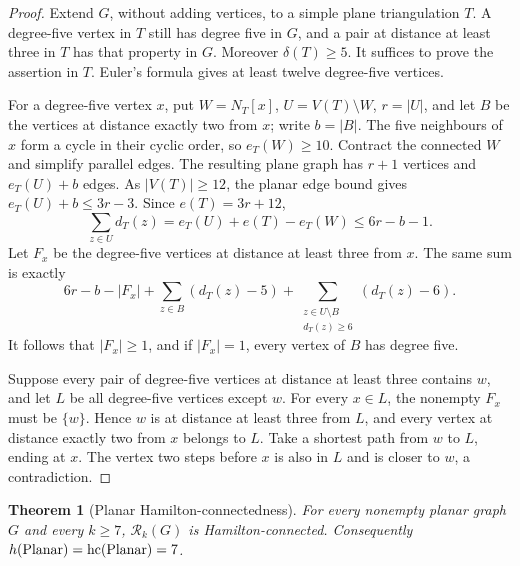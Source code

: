 \documentclass[11pt]{article}
\newtheorem{theorem}{Theorem}[section]
\theoremstyle{remark}
\newcommand{\Rk}{\mathcal R_k}
\newcommand{\hc}{\operatorname{hc}}
\numberwithin{equation}{section}
\numberwithin{table}{section}
\begin{document}
\begin{proof}
Extend $G$, without adding vertices, to a simple plane triangulation
$T$.  A degree-five vertex in $T$ still has degree five in $G$, and a
pair at distance at least three in $T$ has that property in $G$.
Moreover $\delta(T)\ge5$.  It suffices to prove the assertion in $T$.
Euler's formula gives at least twelve degree-five vertices.

For a degree-five vertex $x$, put $W=N_T[x]$, $U=V(T)\setminus W$,
$r=|U|$, and let $B$ be the vertices at distance exactly two from $x$;
write $b=|B|$.  The five neighbours of $x$ form a cycle in their cyclic
order, so $e_T(W)\ge10$.  Contract the connected $W$ and simplify
parallel edges.  The resulting plane graph has $r+1$ vertices and
$e_T(U)+b$ edges.  As $|V(T)|\ge12$, the planar edge bound gives
$e_T(U)+b\le3r-3$.  Since $e(T)=3r+12$,
\[
 \sum_{z\in U}d_T(z)
 =e_T(U)+e(T)-e_T(W)\le6r-b-1.
\]
Let $F_x$ be the degree-five vertices at distance at least three from
$x$.  The same sum is exactly
\[
 6r-b-|F_x|
 +\sum_{z\in B}(d_T(z)-5)
 +\sum_{\substack{z\in U\setminus B\\ d_T(z)\ge6}}(d_T(z)-6).
\]
It follows that $|F_x|\ge1$, and if $|F_x|=1$, every vertex of $B$
has degree five.

Suppose every pair of degree-five vertices at distance at least three
contains $w$, and let $L$ be all degree-five vertices except $w$.
For every $x\in L$, the nonempty $F_x$ must be $\{w\}$.  Hence
$w$ is at distance at least three from $L$, and every vertex at distance
exactly two from $x$ belongs to $L$.  Take a shortest path from $w$
to $L$, ending at $x$.  The vertex two steps before $x$ is also in
$L$ and is closer to $w$, a contradiction.
\end{proof}

\begin{theorem}[Planar Hamilton-connectedness]
\label{thm:planar-hc}
For every nonempty planar graph $G$ and every $k\ge7$, $\Rk(G)$ is
Hamilton-connected.  Consequently
$h(\textup{Planar})=\hc(\textup{Planar})=7$.
\end{theorem}
\end{document}
